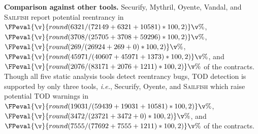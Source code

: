 \documentclass[conference, romanappendices]{tex/IEEEtran}
\theoremstyle{bfnote}
\newcommand{\toolname}{\textsc{Sailfish}\xspace}
\newcommand{\oyente}{{\sc Oyente}\xspace}
\newcommand{\securify}{{\sc Securify}\xspace}
\newcommand{\vandal}{{\sc Vandal}\xspace}
\newcommand{\reentrancy}{{reentrancy}\xspace}
\newcommand{\mythril}{{\sc Mythril}\xspace}
\newcommand{\ie}{\textit{i.e.}}
\newcommand{\securifySafeDAO}{72149}
\newcommand{\securifyUnsafeDAO}{6321}
\newcommand{\securifySafeTOD}{59439}
\newcommand{\securifyUnsafeTOD}{19031}
\newcommand{\securifyTimeout}{10581}
\newcommand{\mythrilSafeDAO}{25705}
\newcommand{\mythrilUnsafeDAO}{3708}
\newcommand{\mythrilTimeout}{59296}
\newcommand{\vandalSafeDAO}{40607}
\newcommand{\vandalUnsafeDAO}{45971}
\newcommand{\vandalTimeout}{1373}
\newcommand{\oyenteSafeDAO}{26924}
\newcommand{\oyenteUnsafeDAO}{269}
\newcommand{\oyenteSafeTOD}{23721}
\newcommand{\oyenteUnsafeTOD}{3472}
\newcommand{\oyenteTimeout}{0}
\newcommand{\clintSafeDAO}{83171}
\newcommand{\clintUnsafeDAO}{2076}
\newcommand{\clintSafeTOD}{77692}
\newcommand{\clintUnsafeTOD}{7555}
\newcommand{\clintTimeout}{1211}
\begin{document}
\noindent
\textbf{Comparison against other tools.}
\securify, \mythril, \oyente, \vandal, and \toolname{} report potential \reentrancy in $\FPeval{\v}{round(\securifyUnsafeDAO/(\securifySafeDAO+\securifyUnsafeDAO+\securifyTimeout)*100,2)}\v\%$, $\FPeval{\v}{round(\mythrilUnsafeDAO/(\mythrilSafeDAO+\mythrilUnsafeDAO+\mythrilTimeout)*100,2)}\v\%$, $\FPeval{\v}{round(\oyenteUnsafeDAO/(\oyenteSafeDAO+\oyenteUnsafeDAO+\oyenteTimeout)*100,2)}\v\%$, $\FPeval{\v}{round(\vandalUnsafeDAO/(\vandalSafeDAO+\vandalUnsafeDAO+\vandalTimeout)*100,2)}\v\%$, and $\FPeval{\v}{round(\clintUnsafeDAO/(\clintSafeDAO+\clintUnsafeDAO+\clintTimeout)*100,2)}\v\%$ of the contracts.
Though all five static analysis tools detect \reentrancy bugs, {TOD\EndAccSupp{}} detection is supported by only three tools, \ie, \securify, \oyente, and \toolname which raise potential {TOD\EndAccSupp{}} warnings in $\FPeval{\v}{round(\securifyUnsafeTOD/(\securifySafeTOD+\securifyUnsafeTOD+\securifyTimeout)*100,2)}\v\%$, $\FPeval{\v}{round(\oyenteUnsafeTOD/(\oyenteSafeTOD+\oyenteUnsafeTOD+\oyenteTimeout)*100,2)}\v\%$, and $\FPeval{\v}{round(\clintUnsafeTOD/(\clintSafeTOD+\clintUnsafeTOD+\clintTimeout)*100,2)}\v\%$ of the contracts.
\end{document}
